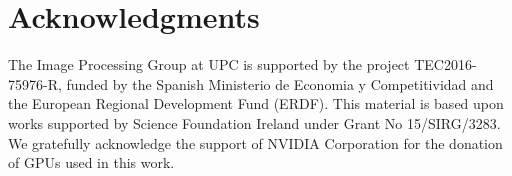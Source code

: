 \documentclass[times,twocolumn,final,authoryear]{elsarticle}
\begin{document}



% 
% 
% 
% 
% 
% 

\section*{Acknowledgments}
The Image Processing Group at UPC is supported by the project TEC2016-75976-R, funded by the Spanish Ministerio de Economia y Competitividad and the European Regional Development Fund (ERDF). 
This material is based upon works supported by Science Foundation Ireland under Grant No 15/SIRG/3283.
We gratefully acknowledge the support of NVIDIA Corporation for the donation of GPUs used in this work.









\end{document}
